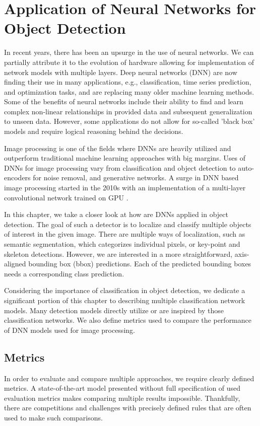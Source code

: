 \chapter{Application of Neural Networks for Object Detection}
\label{chap:nns}
In recent years, there has been an upsurge in the use of neural networks. We can partially attribute it to the evolution of hardware allowing for implementation of network models with multiple layers. Deep neural networks (DNN) are now finding their use in many applications, e.g., classification, time series prediction, and optimization tasks, and are replacing many older machine learning methods. Some of the benefits of neural networks include their ability to find and learn complex non-linear relationships in provided data and subsequent generalization to unseen data. However, some applications do not allow for so-called 'black box' models and require logical reasoning behind the decisions.

Image processing is one of the fields where DNNs are heavily utilized and outperform traditional machine learning approaches with big margins. Uses of DNNs for image processing vary from classification and object detection to auto-encoders for noise removal, and generative networks. A surge in DNN based image processing started in the 2010s with an implementation of a multi-layer convolutional network trained on GPU \cite{bib:deepOnGpu}. 

In this chapter, we take a closer look at how are DNNs applied in object detection. The goal of such a detector is to localize and classify multiple objects of interest in the given image. There are multiple ways of localization, such as semantic segmentation, which categorizes individual pixels, or key-point and skeleton detections. However, we are interested in a more straightforward, axis-aligned bounding box (bbox) predictions. Each of the predicted bounding boxes needs a corresponding class prediction.

Considering the importance of classification in object detection, we dedicate a significant portion of this chapter to describing multiple classification network models. Many detection models directly utilize or are inspired by those classification networks. We also define metrics used to compare the performance of DNN models used for image processing.

\section{Metrics}
In order to evaluate and compare multiple approaches, we require clearly defined metrics. A state-of-the-art model presented without full specification of used evaluation metrics makes comparing multiple results impossible. Thankfully, there are competitions and challenges with precisely defined rules that are often used to make such comparisons. 


